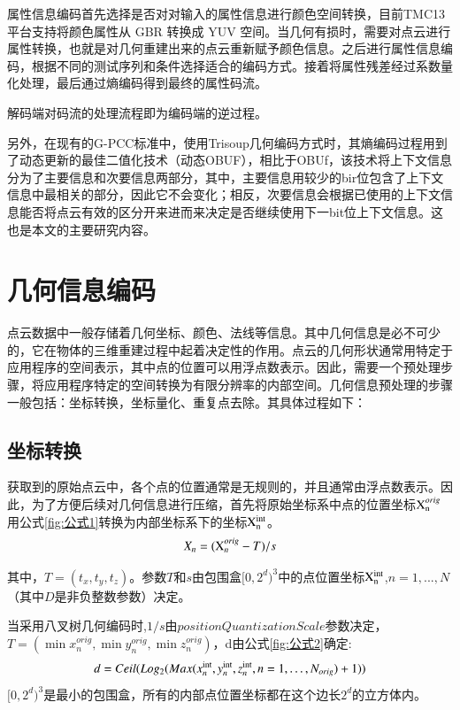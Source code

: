 \documentclass[bachelor,print,msfonts]{xduthesis}
\begin{document}
属性信息编码首先选择是否对对输入的属性信息进行颜色空间转换，目前TMC13 平台支持将颜色属性从 GBR 转换成 YUV 空间。当几何有损时，需要对点云进行属性转换，也就是对几何重建出来的点云重新赋予颜色信息。之后进行属性信息编码，根据不同的测试序列和条件选择适合的编码方式。接着将属性残差经过系数量化处理，最后通过熵编码得到最终的属性码流。

解码端对码流的处理流程即为编码端的逆过程。

另外，在现有的G-PCC标准中，使用Trisoup几何编码方式时，其熵编码过程用到了动态更新的最佳二值化技术（动态OBUF），相比于OBUf，该技术将上下文信息分为了主要信息和次要信息两部分，其中，主要信息用较少的bir位包含了上下文信息中最相关的部分，因此它不会变化；相反，次要信息会根据已使用的上下文信息能否将点云有效的区分开来进而来决定是否继续使用下一bit位上下文信息。这也是本文的主要研究内容。
\section{几何信息编码}
点云数据中一般存储着几何坐标、颜色、法线等信息。其中几何信息是必不可少的，它在物体的三维重建过程中起着决定性的作用。点云的几何形状通常用特定于应用程序的空间表示，其中点的位置可以用浮点数表示。因此，需要一个预处理步骤，将应用程序特定的空间转换为有限分辨率的内部空间。几何信息预处理的步骤一般包括：坐标转换，坐标量化、重复点去除。其具体过程如下：
\subsection{坐标转换}
获取到的原始点云中，各个点的位置通常是无规则的，并且通常由浮点数表示。因此，为了方便后续对几何信息进行压缩，首先将原始坐标系中点的位置坐标${\rm{X}}_{\rm{n}}^{orig}$用公式\ref{fig:公式1}转换为内部坐标系下的坐标${\rm{X}}_{\rm{n}}^{{\mathop{\rm int}}}$。
\begin{equation}
    {X_n} = ({\rm{X}}_n^{orig} - T)/s
    \label{fig:公式1}
\end{equation}

其中，$T=({t_x},{t_y},{t_z})$。参数$T$和$s$由包围盒$[0,{2^d})^3$中的点位置坐标${\rm{X}}_{\rm{n}}^{{\mathop{\rm int}}}$,$n = 1,...,N$（其中$ D $是非负整数参数）决定。

当采用八叉树几何编码时,$1/s$由$positionQuantizationScale$参数决定，$T = (\min x_n^{orig},\min y_n^{orig},\min z_n^{orig})$，d由公式\ref{fig:公式2}确定:
\begin{equation}
    d = Ceil(Lo{g_2}(Max(x_n^{{\mathop{\rm int}} },y_n^{{\mathop{\rm int}} },z_n^{{\mathop{\rm int}} },n = 1, \ldots ,{N_{orig}}) + 1))
    \label{fig:公式2}
\end{equation}
$[0,{2^d})^3$是最小的包围盒，所有的内部点位置坐标都在这个边长${2^d}$的立方体内。
\end{document}
